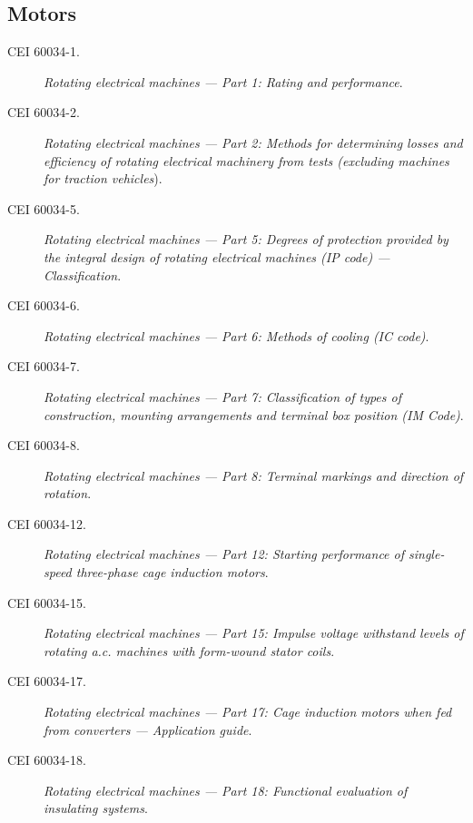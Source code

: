 \subsection*{Motors}
\begin{description}
	\item [\hspace{5mm}CEI 60034-1.] \textit{Rotating electrical machines --- Part 1: Rating and performance}.
	\item [\hspace{5mm}CEI 60034-2.] \textit{Rotating electrical machines --- Part 2: Methods for determining losses and
		efficiency of rotating electrical machinery from tests (excluding machines for traction vehicles}).
	\item [\hspace{5mm}CEI 60034-5.] \textit{Rotating electrical machines --- Part 5: Degrees of protection provided by the
		integral design of rotating electrical machines (IP code) ---  Classification}.
	\item [\hspace{5mm}CEI 60034-6.] \textit{Rotating electrical machines --- Part 6: Methods of cooling (IC code)}.
	\item [\hspace{5mm}CEI 60034-7.] \textit{Rotating electrical machines --- Part 7: Classification of types of construction, mounting arrangements and terminal box position (IM Code)}.
	\item [\hspace{5mm}CEI 60034-8.] \textit{Rotating electrical machines --- Part 8: Terminal markings and direction of
		rotation}.
	\item [\hspace{5mm}CEI 60034-12.] \textit{Rotating electrical machines --- Part 12: Starting performance of single-speed
		three-phase cage induction motors}.
	\item [\hspace{5mm}CEI 60034-15.] \textit{Rotating electrical machines --- Part 15: Impulse voltage withstand levels of
		rotating a.c. machines with form-wound stator coils}.
	\item [\hspace{5mm}CEI 60034-17.] \textit{Rotating electrical machines --- Part 17: Cage induction motors when fed from
		converters --- Application guide}.
	\item [\hspace{5mm}CEI 60034-18.] \textit{Rotating electrical machines --- Part 18: Functional evaluation of insulating
		systems}.
\end{description}

